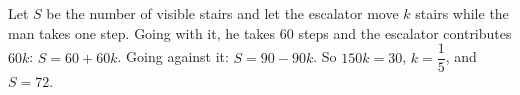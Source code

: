 Let $S$ be the number of visible stairs and let the escalator move $k$ stairs while the man takes one step. Going with it, he takes $60$ steps and the escalator contributes $60k$: $S=60+60k$. Going against it: $S=90-90k$. So $150k=30$, $k=\dfrac{1}{5}$, and $S=\boxed{72}$.
